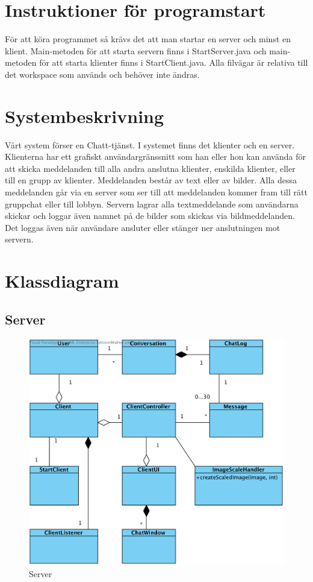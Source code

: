 \documentclass[a4paper,11pt]{article}
\begin{document}
\section{Instruktioner för programstart}
För att köra programmet så krävs det att man startar en server och minst en klient. Main-metoden för att starta servern finns i StartServer.java och main-metoden för att starta klienter finns i StartClient.java. Alla filvägar är relativa till det workspace som används och behöver inte ändras.

\section{Systembeskrivning}

Vårt system förser en Chatt-tjänst. I systemet finns det klienter och en server. Klienterna har ett grafiskt användargränssnitt som han eller hon kan använda för att skicka meddelanden till alla andra anslutna klienter, enskilda klienter, eller till en grupp av klienter. Meddelanden består av text eller av bilder. Alla dessa meddelanden går via en server som ser till att meddelanden kommer fram till rätt gruppchat eller till lobbyn. Servern lagrar alla textmeddelande som användarna skickar och loggar även namnet på de bilder som skickas via bildmeddelanden. Det loggas även när användare ansluter eller stänger ner anslutningen mot servern.

\section{Klassdiagram}
\subsection{Server}
	\begin{figure}[H]
		\centering
		\includegraphics[width=\textwidth]{diagram/Client.png}
		\caption{Server}

	\end{figure}
\end{document}
